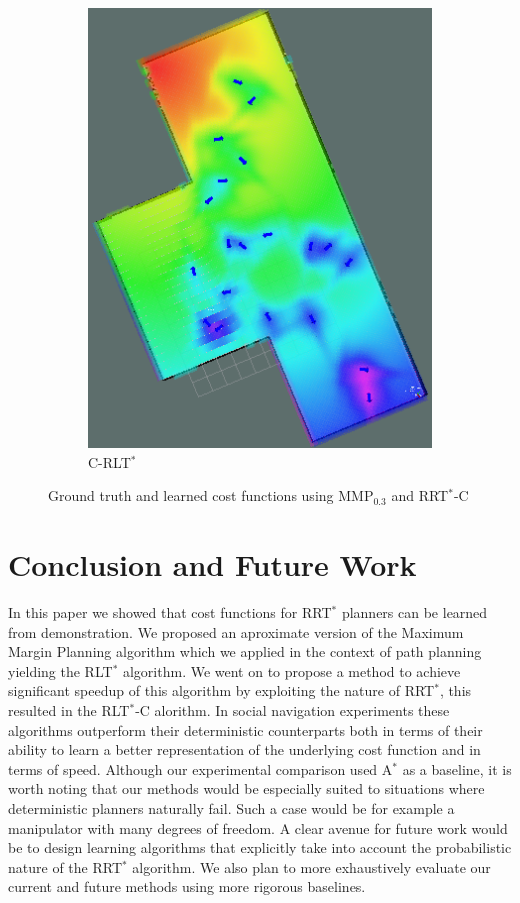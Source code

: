 \documentclass{article}  %
\begin{document}
\begin{figure}[tbh]
\begin{subfigure}[b]{0.296\columnwidth}
    \includegraphics[width=1.\textwidth]{images/rrt_cf.png}
    \caption{C-RLT$^*$}
    \label{fig:rrt_cf}
  \end{subfigure} 
  	  \caption{Ground truth and learned cost functions using MMP$_{0.3}$ and RRT$^*$-C  \label{fig:cfs}}
  \end{figure}


\section{Conclusion and Future Work}
	In this paper we showed that cost functions for RRT$^*$ planners can be learned from demonstration. We proposed an aproximate version of the Maximum Margin Planning algorithm which we applied in the context of path planning yielding the RLT$^*$ algorithm. We went on to propose a method to achieve significant speedup of this algorithm by exploiting the nature of RRT$^*$, this resulted in the RLT$^*$-C alorithm. In social navigation experiments these algorithms outperform their deterministic counterparts both in terms of their ability to learn a better representation of the underlying cost function and in terms of speed. Although our experimental comparison used A$^*$ as a baseline, it is worth noting that our methods would be especially suited to situations where deterministic planners naturally fail. Such a case would be for example a manipulator with many degrees of freedom. A clear avenue for future work would be to design learning algorithms that explicitly take into account the probabilistic nature of the RRT$^*$ algorithm. We also plan to more exhaustively evaluate our current and future methods using more rigorous baselines.




\end{document}
